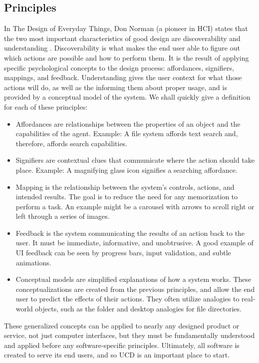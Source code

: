 \documentclass[12pt, oneside]{article}
\begin{document}
\subsection{Principles}

In The Design of Everyday Things, Don Norman (a pioneer in HCI) states that the two most important characteristics of good design are discoverability and understanding \cite[p.~3]{norman_2013}. Discoverability is what makes the end user able to figure out which actions are possible and how to perform them. It is the result of applying specific psychological concepts to the design process: affordances, signifiers, mappings, and feedback. Understanding gives the user context for what those actions will do, as well as the informing them about proper usage, and is provided by a conceptual model of the system. We shall quickly give a definition for each of these principles:

\begin{itemize}
\raggedright
    \item Affordances are relationships between the properties of an object and the capabilities of the agent. Example: A file system affords text search and, therefore, affords search capabilities.
    \item Signifiers are contextual clues that communicate where the action should take place. Example: A magnifying glass icon signifies a searching affordance.
    \item Mapping is the relationship between the system's controls, actions, and intended results. The goal is to reduce the need for any memorization to perform a task. An example might be a carousel with arrows to scroll right or left through a series of images.
    \item Feedback is the system communicating the results of an action back to the user. It must be immediate, informative, and unobtrusive. A good example of UI feedback can be seen by progress bars, input validation, and subtle animations.
    \item Conceptual models are simplified explanations of how a system works. These conceptualizations are created from the previous principles, and allow the end user to predict the effects of their actions. They often utilize analogies to real-world objects, such as the folder and desktop analogies for file directories.
\end{itemize}

These generalized concepts can be applied to nearly any designed product or service, not just computer interfaces, but they must be fundamentally understood and applied before any software-specific principles. Ultimately, all software is created to serve its end users, and so UCD is an important place to start.
\end{document}
